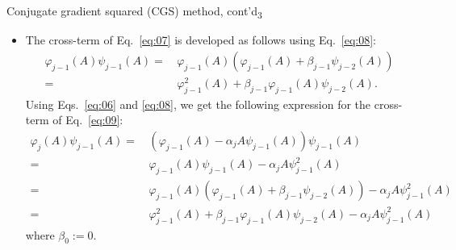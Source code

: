 \documentclass[t,usepdftitle=false]{beamer}
\begin{document}
\begin{frame}{Conjugate gradient squared (CGS) method, cont'd\textsubscript{3}}
\begin{itemize}
\item The cross-term of Eq.~\eqref{eq:07} is developed as follows using Eq.~\eqref{eq:08}:
\begin{align}
\varphi_{j-1}(A)\psi_{j-1}(A)
=&\,\varphi_{j-1}(A)(\varphi_{j-1}(A)+\beta_{j-1}\psi_{j-2}(A))\nonumber\\
=&\,\varphi_{j-1}^2(A)+\beta_{j-1}\varphi_{j-1}(A)\psi_{j-2}(A).\label{eq:10}
\end{align}
Using Eqs.~\eqref{eq:06} and \eqref{eq:08}, we get the following expression for the cross-term of Eq.~\eqref{eq:09}:
\begin{align}
\varphi_{j}(A)\psi_{j-1}(A)
=&\,(\varphi_{j-1}(A)-\alpha_{j}A\psi_{j-1}(A))\psi_{j-1}(A)\nonumber\\
=&\,\varphi_{j-1}(A)\psi_{j-1}(A)-\alpha_{j}A\psi_{j-1}^2(A)\nonumber\\
=&\,\varphi_{j-1}(A)(\varphi_{j-1}(A)+\beta_{j-1}\psi_{j-2}(A))-\alpha_{j}A\psi_{j-1}^2(A)\nonumber\\
=&\,\varphi_{j-1}^2(A)+\beta_{j-1}\varphi_{j-1}(A)\psi_{j-2}(A)-\alpha_{j}A\psi_{j-1}^2(A)\label{eq:11}
\end{align}
where $\beta_0:=0$.
\end{itemize}
\end{frame}
\end{document}
